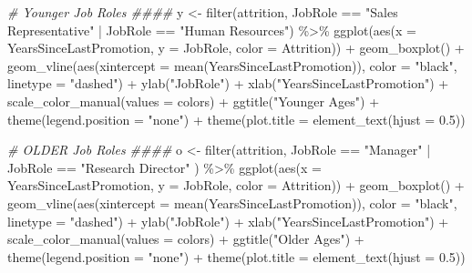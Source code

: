 \documentclass[
]{article}
\newenvironment{Shaded}{\begin{snugshade}}{\end{snugshade}}
\newcommand{\AttributeTok}[1]{\textcolor[rgb]{0.77,0.63,0.00}{#1}}
\newcommand{\CommentTok}[1]{\textcolor[rgb]{0.56,0.35,0.01}{\textit{#1}}}
\newcommand{\FloatTok}[1]{\textcolor[rgb]{0.00,0.00,0.81}{#1}}
\newcommand{\FunctionTok}[1]{\textcolor[rgb]{0.00,0.00,0.00}{#1}}
\newcommand{\NormalTok}[1]{#1}
\newcommand{\OtherTok}[1]{\textcolor[rgb]{0.56,0.35,0.01}{#1}}
\newcommand{\SpecialCharTok}[1]{\textcolor[rgb]{0.00,0.00,0.00}{#1}}
\newcommand{\StringTok}[1]{\textcolor[rgb]{0.31,0.60,0.02}{#1}}
\begin{document}
\begin{Shaded}
\begin{Highlighting}[]
\CommentTok{\# Younger Job Roles \#\#\#\#}
\NormalTok{y }\OtherTok{\textless{}{-}} \FunctionTok{filter}\NormalTok{(attrition, JobRole }\SpecialCharTok{==} \StringTok{"Sales Representative"} \SpecialCharTok{|}\NormalTok{ JobRole }\SpecialCharTok{==} \StringTok{"Human Resources"}\NormalTok{) }\SpecialCharTok{\%\textgreater{}\%}
  \FunctionTok{ggplot}\NormalTok{(}\FunctionTok{aes}\NormalTok{(}\AttributeTok{x =}\NormalTok{ YearsSinceLastPromotion, }\AttributeTok{y =}\NormalTok{ JobRole, }\AttributeTok{color =}\NormalTok{ Attrition)) }\SpecialCharTok{+}
  \FunctionTok{geom\_boxplot}\NormalTok{() }\SpecialCharTok{+}
  \FunctionTok{geom\_vline}\NormalTok{(}\FunctionTok{aes}\NormalTok{(}\AttributeTok{xintercept =} \FunctionTok{mean}\NormalTok{(YearsSinceLastPromotion)), }\AttributeTok{color =} \StringTok{"black"}\NormalTok{, }\AttributeTok{linetype =} \StringTok{"dashed"}\NormalTok{) }\SpecialCharTok{+}
  \FunctionTok{ylab}\NormalTok{(}\StringTok{"JobRole"}\NormalTok{) }\SpecialCharTok{+}
  \FunctionTok{xlab}\NormalTok{(}\StringTok{"YearsSinceLastPromotion"}\NormalTok{) }\SpecialCharTok{+}
  \FunctionTok{scale\_color\_manual}\NormalTok{(}\AttributeTok{values =}\NormalTok{ colors) }\SpecialCharTok{+}
  \FunctionTok{ggtitle}\NormalTok{(}\StringTok{"Younger Ages"}\NormalTok{) }\SpecialCharTok{+}
  \FunctionTok{theme}\NormalTok{(}\AttributeTok{legend.position =} \StringTok{"none"}\NormalTok{) }\SpecialCharTok{+}
  \FunctionTok{theme}\NormalTok{(}\AttributeTok{plot.title =} \FunctionTok{element\_text}\NormalTok{(}\AttributeTok{hjust =} \FloatTok{0.5}\NormalTok{)) }
  

\CommentTok{\# OLDER Job Roles \#\#\#\#}
\NormalTok{o }\OtherTok{\textless{}{-}} \FunctionTok{filter}\NormalTok{(attrition, JobRole }\SpecialCharTok{==} \StringTok{"Manager"} \SpecialCharTok{|}\NormalTok{ JobRole }\SpecialCharTok{==} \StringTok{"Research Director"}\NormalTok{ ) }\SpecialCharTok{\%\textgreater{}\%}
  \FunctionTok{ggplot}\NormalTok{(}\FunctionTok{aes}\NormalTok{(}\AttributeTok{x =}\NormalTok{ YearsSinceLastPromotion, }\AttributeTok{y =}\NormalTok{ JobRole, }\AttributeTok{color =}\NormalTok{ Attrition)) }\SpecialCharTok{+}
  \FunctionTok{geom\_boxplot}\NormalTok{() }\SpecialCharTok{+}
  \FunctionTok{geom\_vline}\NormalTok{(}\FunctionTok{aes}\NormalTok{(}\AttributeTok{xintercept =} \FunctionTok{mean}\NormalTok{(YearsSinceLastPromotion)), }\AttributeTok{color =} \StringTok{"black"}\NormalTok{, }\AttributeTok{linetype =} \StringTok{"dashed"}\NormalTok{) }\SpecialCharTok{+}
  \FunctionTok{ylab}\NormalTok{(}\StringTok{"JobRole"}\NormalTok{) }\SpecialCharTok{+}
  \FunctionTok{xlab}\NormalTok{(}\StringTok{"YearsSinceLastPromotion"}\NormalTok{) }\SpecialCharTok{+}
  \FunctionTok{scale\_color\_manual}\NormalTok{(}\AttributeTok{values =}\NormalTok{ colors) }\SpecialCharTok{+}
  \FunctionTok{ggtitle}\NormalTok{(}\StringTok{"Older Ages"}\NormalTok{) }\SpecialCharTok{+}
  \FunctionTok{theme}\NormalTok{(}\AttributeTok{legend.position =} \StringTok{"none"}\NormalTok{) }\SpecialCharTok{+}
  \FunctionTok{theme}\NormalTok{(}\AttributeTok{plot.title =} \FunctionTok{element\_text}\NormalTok{(}\AttributeTok{hjust =} \FloatTok{0.5}\NormalTok{)) }



\end{Highlighting}
\end{Shaded}
\end{document}
